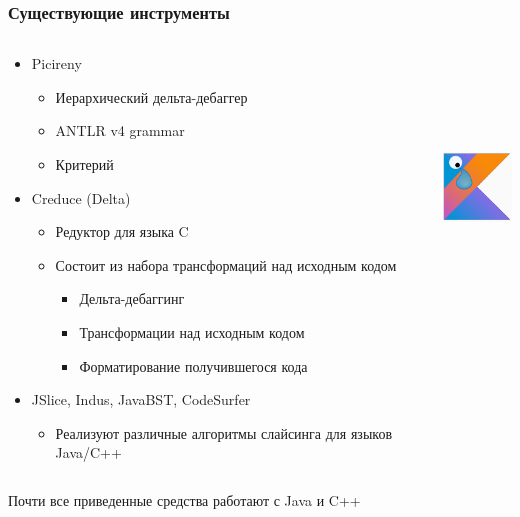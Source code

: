 \begin{frame}
\frametitle{Существующие инструменты}
\begin{minipage}[0.2\textheight]{\textwidth}
\begin{columns}[T]
\begin{column}{0.8\textwidth}
	\begin{itemize}
		\item Picireny
			\begin{itemize}
				\item Иерархический дельта-дебаггер 
				\item ANTLR v4 grammar
				\item Критерий
			\end{itemize}
		\item Creduce (Delta)
			\begin{itemize}
				\item Редуктор для языка C
				\item Состоит из набора трансформаций над исходным кодом
				\begin{itemize}
					\item Дельта-дебаггинг
					\item Трансформации над исходным кодом
					\item Форматирование получившегося кода
				\end{itemize}
			\end{itemize}
		\item JSlice, Indus, JavaBST, CodeSurfer
			\begin{itemize}
				\item Реализуют различные алгоритмы слайсинга для языков Java/C++
			\end{itemize}
	\end{itemize}
\end{column}
\begin{column}{0.2\textwidth}
\ \\ \ \\ \ \\ \ \\ \ \\ 
\includegraphics[width=20mm]{image/sadKotlin.png}
\end{column}
\end{columns}
\end{minipage}
\center
	Почти все приведенные средства работают с Java и C++
\end{frame}


